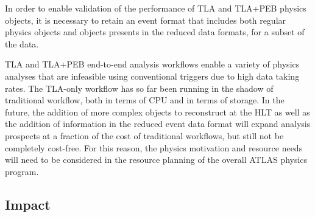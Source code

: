 In order to enable validation of the performance of TLA and TLA+PEB physics objects, it is necessary to retain an event format that includes both regular physics objects and objects presents in the reduced data formats, for a subset of the data.  

TLA and TLA+PEB end-to-end analysis workflows enable a variety of physics analyses that are infeasible using conventional triggers due to high data taking rates. The TLA-only workflow has so far been running in the shadow of traditional workflow, both in terms of CPU and in terms of storage. In the future, the addition of more complex objects to reconstruct at the HLT as well as the addition of information in the reduced event data format will expand analysis prospects at a fraction of the cost of traditional workflows, but still not be completely cost-free. For this reason, the physics motivation and resource needs will need to be considered in the resource planning of the overall ATLAS physics program.



\subsection{Impact}

